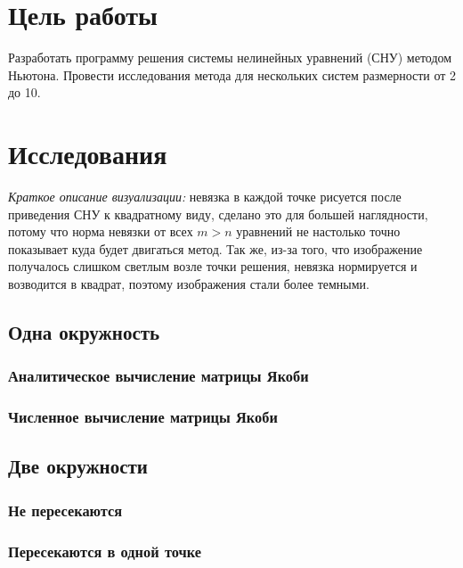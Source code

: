 
\section{Цель работы}

Разработать программу решения системы нелинейных уравнений (СНУ) методом Ньютона. Провести исследования метода для нескольких систем размерности от 2 до 10.

\section{Исследования}

\textit{Краткое описание визуализации:} невязка в каждой точке рисуется после приведения СНУ к квадратному виду, сделано это для большей наглядности, потому что норма невязки от всех $m>n$ уравнений не настолько точно показывает куда будет двигаться метод. Так же, из-за того, что изображение получалось слишком светлым возле точки решения, невязка нормируется и возводится в квадрат, поэтому изображения стали более темными.

\subsection{Одна окружность}
\subsubsection{Аналитическое вычисление матрицы Якоби}
\subsubsection{Численное вычисление матрицы Якоби}
\subsection{Две окружности}
\subsubsection{Не пересекаются}
\subsubsection{Пересекаются в одной точке}
